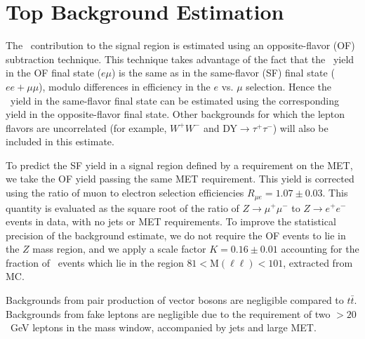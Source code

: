 \section{Top Background Estimation}
\label{sec:topbkg}

The \ttbar\ contribution to the signal region is estimated using an opposite-flavor (OF) subtraction technique.
This technique takes advantage of the fact that the \ttbar\ yield in the 
OF final state ($e\mu$) is the same as in the same-flavor (SF) final state
($ee+\mu\mu$), modulo differences in efficiency in the $e$ vs. $\mu$ selection.
Hence the \ttbar\ yield in the same-flavor final state can be estimated
using the corresponding yield in the opposite-flavor final state. 
Other backgrounds for which the lepton flavors are
uncorrelated (for example, $W^+W^-$ and DY$\rightarrow \tau^+\tau^-$) will also be included in
this estimate.

To predict the SF yield in a signal region defined by a requirement on the MET, we take the 
OF yield passing the same MET requirement. This yield is corrected using the ratio of
muon to electron selection efficiencies $R_{\mu e}=1.07 \pm 0.03$.
This quantity is evaluated as the square root of the ratio of $Z\to\mu^+\mu^-$ to $Z\to e^+e^-$
events in data, with no jets or MET requirements. To improve the statistical precision
of the background estimate, we do not require the OF events to lie in the $Z$ mass region,
and we apply a scale factor $K=0.16 \pm 0.01$ accounting for the fraction of \ttbar\ events
which lie in the region $81 < \mathrm{M(\ell\ell)} < 101$\GeVcc, extracted from MC.

Backgrounds from pair production of vector bosons are negligible compared to $t\bar{t}$.
Backgrounds from fake leptons are negligible due to the requirement of two \pt$ > 20$~GeV leptons
in the \Z mass window, accompanied by jets and large MET.
